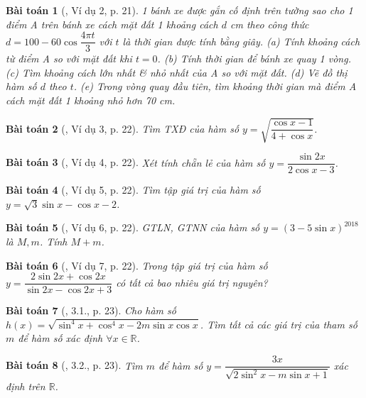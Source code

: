 \documentclass{article}
\newtheorem{baitoan}{Bài toán}
\begin{document}
\begin{baitoan}[\cite{Hung_nang_cao_phat_trien_Toan_11_tap_1}, Ví dụ 2, p. 21]
	1 bánh xe được gắn cố định trên tường sao cho 1 điểm A trên bánh xe cách mặt đất 1 khoảng cách $d$ {\rm cm} theo công thức $d = 100 - 60\cos\dfrac{4\pi t}{3}$ với $t$ là thời gian được tính bằng giây. (a) Tính khoảng cách từ điểm A so với mặt đất khi $t = 0$. (b) Tính thời gian để bánh xe quay 1 vòng. (c) Tìm khoảng cách lớn nhất \& nhỏ nhất của A so với mặt đất. (d) Vẽ đồ thị hàm số $d$ theo $t$. (e) Trong vòng quay đầu tiên, tìm khoảng thời gian mà điểm A cách mặt đất 1 khoảng nhỏ hơn {\rm70 cm}.
\end{baitoan}

\begin{baitoan}[\cite{Hung_nang_cao_phat_trien_Toan_11_tap_1}, Ví dụ 3, p. 22]
	Tìm {\rm TXĐ} của hàm số $y = \sqrt{\dfrac{\cos x - 1}{4 + \cos x}}$.
\end{baitoan}

\begin{baitoan}[\cite{Hung_nang_cao_phat_trien_Toan_11_tap_1}, Ví dụ 4, p. 22]
	Xét tính chẵn lẻ của hàm số $y = \dfrac{\sin2x}{2\cos x - 3}$.
\end{baitoan}

\begin{baitoan}[\cite{Hung_nang_cao_phat_trien_Toan_11_tap_1}, Ví dụ 5, p. 22]
	Tìm tập giá trị của hàm số $y = \sqrt{3}\sin x - \cos x - 2$.
\end{baitoan}

\begin{baitoan}[\cite{Hung_nang_cao_phat_trien_Toan_11_tap_1}, Ví dụ 6, p. 22]
	{\rm GTLN, GTNN} của hàm số $y = (3 - 5\sin x)^{2018}$ là $M,m$. Tính $M + m$.
\end{baitoan}

\begin{baitoan}[\cite{Hung_nang_cao_phat_trien_Toan_11_tap_1}, Ví dụ 7, p. 22]
	Trong tập giá trị của hàm số $y = \dfrac{2\sin2x + \cos2x}{\sin2x - \cos2x + 3}$ có tất cả bao nhiêu giá trị nguyên?
\end{baitoan}

\begin{baitoan}[\cite{Hung_nang_cao_phat_trien_Toan_11_tap_1}, 3.1., p. 23]
	Cho hàm số $h(x) = \sqrt{\sin^4x + \cos^4x - 2m\sin x\cos x}$. Tìm tất cả các giá trị của tham số $m$ để hàm số xác định $\forall x\in\mathbb{R}$.
\end{baitoan}

\begin{baitoan}[\cite{Hung_nang_cao_phat_trien_Toan_11_tap_1}, 3.2., p. 23]
	Tìm $m$ để hàm số $y = \dfrac{3x}{\sqrt{2\sin^2x - m\sin x + 1}}$ xác định trên $\mathbb{R}$.
\end{baitoan}
\end{document}
